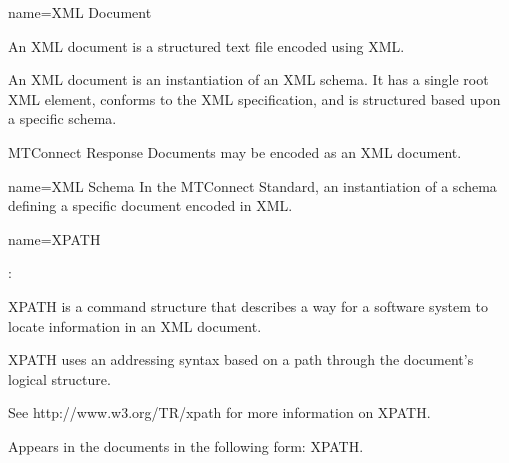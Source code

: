 {
  name={XML Document}
}
{
	An XML document is a structured text file encoded using XML.

	An XML document is an instantiation of an XML schema.  It has a single root XML element, conforms to the XML specification, and is structured based upon a specific schema.

	MTConnect Response Documents may be encoded as an XML document.
}


{
  name={XML Schema}
}
{
	In the MTConnect Standard, an instantiation of a schema defining a specific document encoded in XML.
}


{
  name={XPATH}
}
{
	:

	XPATH is a command structure that describes a way for a software system to locate information in an XML document.  

	XPATH uses an addressing syntax based on a path through the document's logical structure. 

	See http://www.w3.org/TR/xpath for more information on XPATH.

	Appears in the documents in the following form: XPATH.
}







